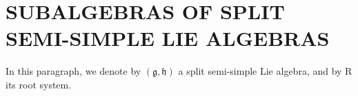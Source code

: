 \section{SUBALGEBRAS OF SPLIT SEMI-SIMPLE LIE ALGEBRAS}

In this paragraph, we denote by \((\mathfrak{g},\mathfrak{h})\) a split semi-simple Lie algebra, and by R its root system.


